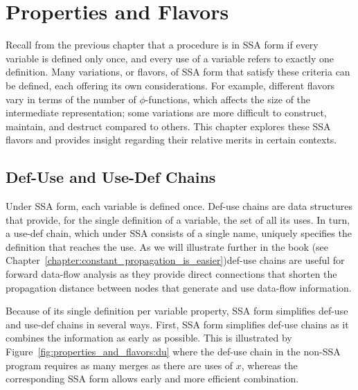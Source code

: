 \chapter{Properties and Flavors }
\label{chapter:properties_and_flavours}




Recall from the previous chapter that a procedure is in SSA form if every variable is defined only once, and every use of a variable refers to exactly one definition. 
Many variations, or flavors, of SSA form that satisfy these criteria can be defined, each offering its own considerations. 
For example, different flavors vary in terms of the number of $\phi$-functions, which affects the size of the intermediate representation; 
some variations are more difficult to construct, maintain, and destruct compared to others. 
This chapter explores these SSA flavors and provides insight regarding their relative merits in certain contexts.

\section{Def-Use and Use-Def Chains}
\label{sec:properties_and_flavours:def-use}
Under SSA form, each variable is defined once. 
Def-use chains are data structures that provide, for the single definition of a variable, the set of all its uses. 
In turn, a use-def chain, which under SSA consists of a single name, uniquely specifies the definition that reaches the use. 
As we will illustrate further in the book \ifconstantprop (see Chapter~\ref{chapter:constant_propagation_is_easier})\fi def-use chains are useful for forward data-flow analysis as they provide direct connections that shorten the propagation distance between nodes that generate and use data-flow information.

Because of its single definition per variable property, SSA form simplifies def-use and use-def chains in several ways. 
First, SSA form simplifies def-use chains as it combines the information as early as possible. 
This is illustrated by Figure~\ref{fig:properties_and_flavors:du} where the def-use chain in the non-SSA program requires as many merges as there are uses of $x$, whereas the corresponding SSA form allows early and more efficient combination.

